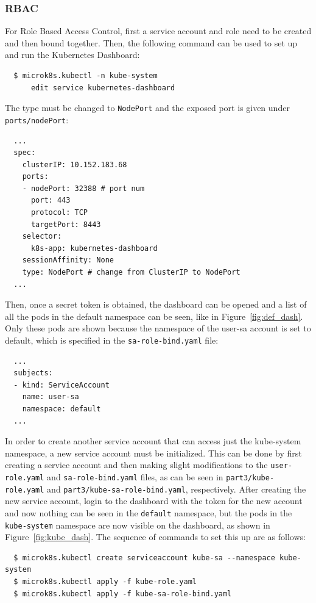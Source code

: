 \documentclass[11pt]{article}
\begin{document}
\subsubsection*{RBAC}
For Role Based Access Control, first a service account and role need to be created and then
bound together. Then, the following command can be used to set up and run the Kubernetes
Dashboard:
\begin{verbatim}
  $ microk8s.kubectl -n kube-system
      edit service kubernetes-dashboard
\end{verbatim}
The type must be changed to \verb|NodePort| and the exposed port is given under \verb|ports/nodePort|:
\begin{verbatim}
  ...
  spec:
    clusterIP: 10.152.183.68
    ports:
    - nodePort: 32388 # port num
      port: 443
      protocol: TCP
      targetPort: 8443
    selector:
      k8s-app: kubernetes-dashboard
    sessionAffinity: None
    type: NodePort # change from ClusterIP to NodePort
  ...
\end{verbatim}
Then, once a secret token is obtained, the dashboard can be opened and a list of all the pods in the
default namespace can be seen, like in Figure~\ref{fig:def_dash}. Only these pods are shown because
the namespace of the user-sa account is set to default, which is specified in the
\verb|sa-role-bind.yaml| file:
\begin{verbatim}
  ...
  subjects:
  - kind: ServiceAccount
    name: user-sa
    namespace: default
  ...
\end{verbatim}
In order to create another service account that can access just the kube-system namespace, a new
service account must be initialized. This can be done by first creating a service account and then
making slight modifications to the \verb|user-role.yaml| and \verb|sa-role-bind.yaml| files, as can
be seen in \verb|part3/kube-role.yaml| and \verb|part3/kube-sa-role-bind.yaml|, respectively. After
creating the new service account, login to the dashboard with the token for the new account and now
nothing can be seen in the \verb|default| namespace, but the pods in the \verb|kube-system| namespace
are now visible on the dashboard, as shown in Figure~\ref{fig:kube_dash}. The sequence of commands
to set this up are as follows:
\begin{verbatim}
  $ microk8s.kubectl create serviceaccount kube-sa --namespace kube-system
  $ microk8s.kubectl apply -f kube-role.yaml
  $ microk8s.kubectl apply -f kube-sa-role-bind.yaml
\end{verbatim}
\end{document}
